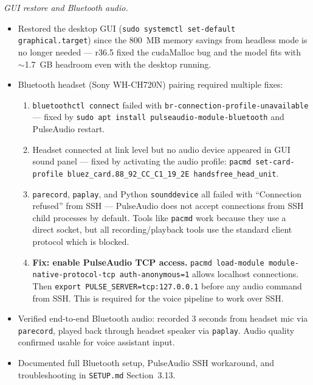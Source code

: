 \documentclass{article}
\theoremstyle{plain}
\theoremstyle{definition}
\theoremstyle{remark}
\begin{document}
\textit{GUI restore and Bluetooth audio.}
\begin{itemize}
\item Restored the desktop GUI (\texttt{sudo systemctl set-default graphical.target}) since the 800~MB memory savings from headless mode is no longer needed --- r36.5 fixed the cudaMalloc bug and the model fits with $\sim$1.7~GB headroom even with the desktop running.
\item Bluetooth headset (Sony WH-CH720N) pairing required multiple fixes:
  \begin{enumerate}
  \item \texttt{bluetoothctl connect} failed with \texttt{br-connection-profile-unavailable} --- fixed by \texttt{sudo apt install pulseaudio-module-bluetooth} and PulseAudio restart.
  \item Headset connected at link level but no audio device appeared in GUI sound panel --- fixed by activating the audio profile: \texttt{pacmd set-card-profile bluez\_card.88\_92\_CC\_C1\_19\_2E handsfree\_head\_unit}.
  \item \texttt{parecord}, \texttt{paplay}, and Python \texttt{sounddevice} all failed with ``Connection refused'' from SSH --- PulseAudio does not accept connections from SSH child processes by default. Tools like \texttt{pacmd} work because they use a direct socket, but all recording/playback tools use the standard client protocol which is blocked.
  \item \textbf{Fix: enable PulseAudio TCP access.} \texttt{pacmd load-module module-native-protocol-tcp auth-anonymous=1} allows localhost connections. Then \texttt{export PULSE\_SERVER=tcp:127.0.0.1} before any audio command from SSH. This is required for the voice pipeline to work over SSH.
  \end{enumerate}
\item Verified end-to-end Bluetooth audio: recorded 3 seconds from headset mic via \texttt{parecord}, played back through headset speaker via \texttt{paplay}. Audio quality confirmed usable for voice assistant input.
\item Documented full Bluetooth setup, PulseAudio SSH workaround, and troubleshooting in \texttt{SETUP.md} Section~3.13.
\end{itemize}
\end{document}
